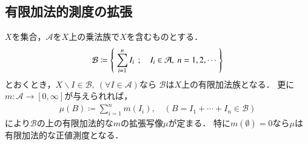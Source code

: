 	\subsection{有限加法的測度の拡張}
		\begin{screen}
			\begin{thm}[有限加法的正値測度空間の生成]\label{thm:forming_finitely_additive_class}
				$X$を集合，$\mathcal{A}$を$X$上の乗法族で$X$を含むものとする．
				\begin{align}
					\mathcal{B} \coloneqq \left\{\ \sum_{i=1}^n I_i\ \, ; \quad I_i \in \mathcal{A},\ n=1,2,\cdots\ \right\}
				\end{align}
				とおくとき，$X \backslash I \in \mathcal{B},\ (\forall I \in \mathcal{A})$なら
				$\mathcal{B}$は$X$上の有限加法族となる．
				更に$m:\mathcal{A} \longrightarrow [0,\infty]$が与えられれば，
				\begin{align}
					\mu(B) \coloneqq \sum_{i=1}^n m(I_i),
					\quad (B=I_1 + \cdots + I_n \in \mathcal{B})
				\end{align}
				により$\mathcal{B}$の上の有限加法的な$m$の拡張写像$\mu$が定まる．
				特に$m(\emptyset) = 0$なら$\mu$は有限加法的な正値測度となる．
			\end{thm}
		\end{screen}
		
